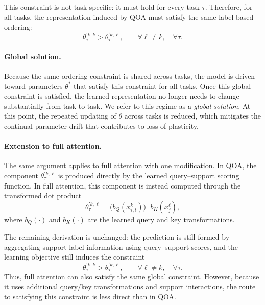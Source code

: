 \documentclass{article}
\begin{document}
This constraint is not task-specific: it must hold for every task $\tau$. Therefore, for all tasks, the representation induced by QOA must satisfy the same label-based ordering:
\begin{equation}
\theta_{\tau}^{\prime k,k}
>
\theta_{\tau}^{\prime k,\ell},
\qquad
\forall \ell\neq k,\quad \forall \tau.
\end{equation}

\paragraph{Global solution.}
Because the same ordering constraint is shared across tasks, the model is driven toward parameters $\theta^\ast$ that satisfy this constraint for all tasks. Once this global constraint is satisfied, the learned representation no longer needs to change substantially from task to task. We refer to this regime as a \emph{global solution}. At this point, the repeated updating of $\theta$ across tasks is reduced, which mitigates the continual parameter drift that contributes to loss of plasticity.

\paragraph{Extension to full attention.}
The same argument applies to full attention with one modification. In QOA, the component $\theta_{\tau}^{\prime k,\ell}$ is produced directly by the learned query--support scoring function. In full attention, this component is instead computed through the transformed dot product
\begin{equation}
\theta_{\tau}^{\prime k,\ell}
=
\big(b_Q(x_{\tau,t}^{k})\big)^\top
b_K(x_j^\ell),
\end{equation}
where $b_Q(\cdot)$ and $b_K(\cdot)$ are the learned query and key transformations.

The remaining derivation is unchanged: the prediction is still formed by aggregating support-label information using query--support scores, and the learning objective still induces the constraint
\begin{equation}
\theta_{\tau}^{\prime k,k}
>
\theta_{\tau}^{\prime k,\ell},
\qquad
\forall \ell\neq k,\quad \forall \tau.
\end{equation}
Thus, full attention can also satisfy the same global constraint. However, because it uses additional query/key transformations and support interactions, the route to satisfying this constraint is less direct than in QOA.
\end{document}
